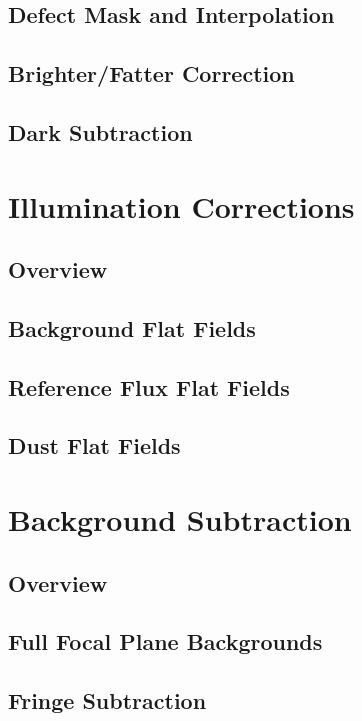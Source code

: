 \subsection{Defect Mask and Interpolation}
\subsection{Brighter/Fatter Correction}
\subsection{Dark Subtraction}

\section{Illumination Corrections}

\subsection{Overview}
\subsection{Background Flat Fields}
\subsection{Reference Flux Flat Fields}
\subsection{Dust Flat Fields}

\section{Background Subtraction}

\subsection{Overview}
\subsection{Full Focal Plane Backgrounds}
\subsection{Fringe Subtraction}

